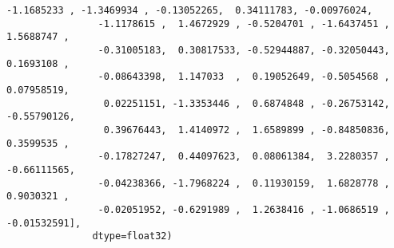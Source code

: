 \documentclass[11pt]{article}
\begin{document}
\begin{Verbatim}[commandchars=\\\{\}]
                -1.1685233 , -1.3469934 , -0.13052265,  0.34111783, -0.00976024,
                -1.1178615 ,  1.4672929 , -0.5204701 , -1.6437451 ,  1.5688747 ,
                -0.31005183,  0.30817533, -0.52944887, -0.32050443,  0.1693108 ,
                -0.08643398,  1.147033  ,  0.19052649, -0.5054568 ,  0.07958519,
                 0.02251151, -1.3353446 ,  0.6874848 , -0.26753142, -0.55790126,
                 0.39676443,  1.4140972 ,  1.6589899 , -0.84850836,  0.3599535 ,
                -0.17827247,  0.44097623,  0.08061384,  3.2280357 , -0.66111565,
                -0.04238366, -1.7968224 ,  0.11930159,  1.6828778 ,  0.9030321 ,
                -0.02051952, -0.6291989 ,  1.2638416 , -1.0686519 , -0.01532591],
               dtype=float32)
\end{Verbatim}
            
\end{document}
